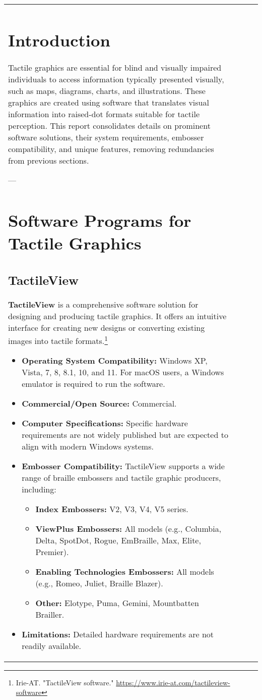 \begin{longtable}{|l|l|l|l|}
{\section{Introduction}
Tactile graphics are essential for blind and visually impaired individuals to access information typically presented visually, such as maps, diagrams, charts, and illustrations. These graphics are created using software that translates visual information into raised-dot formats suitable for tactile perception. This report consolidates details on prominent software solutions, their system requirements, embosser compatibility, and unique features, removing redundancies from previous sections.

---

\section{Software Programs for Tactile Graphics}

\subsection{TactileView}
\textbf{TactileView} is a comprehensive software solution for designing and producing tactile graphics. It offers an intuitive interface for creating new designs or converting existing images into tactile formats.\footnote{Irie-AT. "TactileView software." \url{https://www.irie-at.com/tactileview-software}}

\begin{itemize}
    \item \textbf{Operating System Compatibility:} Windows XP, Vista, 7, 8, 8.1, 10, and 11. For macOS users, a Windows emulator is required to run the software.
    \item \textbf{Commercial/Open Source:} Commercial.
    \item \textbf{Computer Specifications:} Specific hardware requirements are not widely published but are expected to align with modern Windows systems.
    \item \textbf{Embosser Compatibility:} TactileView supports a wide range of braille embossers and tactile graphic producers, including:
    \begin{itemize}
        \item \textbf{Index Embossers:} V2, V3, V4, V5 series.
        \item \textbf{ViewPlus Embossers:} All models (e.g., Columbia, Delta, SpotDot, Rogue, EmBraille, Max, Elite, Premier).
        \item \textbf{Enabling Technologies Embossers:} All models (e.g., Romeo, Juliet, Braille Blazer).
        \item \textbf{Other:} Elotype, Puma, Gemini, Mountbatten Brailler.
    \end{itemize}
    \item \textbf{Limitations:} Detailed hardware requirements are not readily available.
\end{itemize}

}
\end{longtable}
